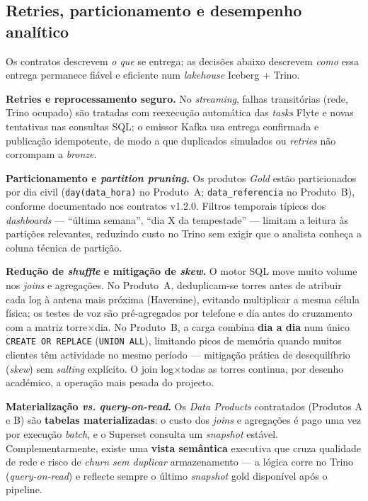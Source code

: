 \documentclass[runningheads]{llncs}
\begin{document}
\subsection{Retries, particionamento e desempenho analítico}

Os contratos descrevem \emph{o que} se entrega; as decisões abaixo descrevem \emph{como} essa entrega permanece fiável e eficiente num \textit{lakehouse} Iceberg + Trino.

\textbf{Retries e reprocessamento seguro.}
No \textit{streaming}, falhas transitórias (rede, Trino ocupado) são tratadas com reexecução automática das \textit{tasks} Flyte e novas tentativas nas consultas SQL; o emissor Kafka usa entrega confirmada e publicação idempotente, de modo a que duplicados simulados ou \textit{retries} não corrompam a \textit{bronze}.

\textbf{Particionamento e \textit{partition pruning}.}
Os produtos \textit{Gold} estão particionados por dia civil (\texttt{day(data\_hora)} no Produto~A; \texttt{data\_referencia} no Produto~B), conforme documentado nos contratos v1.2.0. Filtros temporais típicos dos \textit{dashboards} --- ``última semana'', ``dia X da tempestade'' --- limitam a leitura às partições relevantes, reduzindo custo no Trino sem exigir que o analista conheça a coluna técnica de partição.

\textbf{Redução de \textit{shuffle} e mitigação de \textit{skew}.}
O motor SQL move muito volume nos \textit{joins} e agregações. No Produto~A, deduplicam-se torres antes de atribuir cada log à antena mais próxima (Haversine), evitando multiplicar a mesma célula física; os testes de voz são pré-agregados por telefone e dia antes do cruzamento com a matriz torre$\times$dia. No Produto~B, a carga combina \textbf{dia a dia} num único \texttt{CREATE OR REPLACE} (\texttt{UNION ALL}), limitando picos de memória quando muitos clientes têm actividade no mesmo período --- mitigação prática de desequilíbrio (\textit{skew}) sem \textit{salting} explícito. O join log$\times$todas as torres continua, por desenho académico, a operação mais pesada do projecto.

\textbf{Materialização \textit{vs.} \textit{query-on-read}.}
Os \textit{Data Products} contratados (Produtos A e B) são \textbf{tabelas materializadas}: o custo dos \textit{joins} e agregações é pago uma vez por execução \textit{batch}, e o Superset consulta um \textit{snapshot} estável. Complementarmente, existe uma \textbf{vista semântica} executiva que cruza qualidade de rede e risco de \textit{churn} \emph{sem duplicar} armazenamento --- a lógica corre no Trino (\textit{query-on-read}) e reflecte sempre o último \textit{snapshot} gold disponível após o pipeline.
\end{document}
